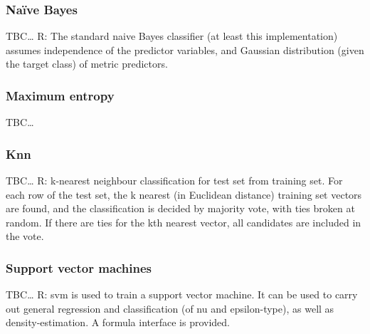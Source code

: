 \subsubsection{Na\"{i}ve Bayes} %
TBC\dots
R: The standard naive Bayes classifier (at least this implementation) assumes independence of the predictor variables, and Gaussian distribution (given the target class) of metric predictors.


\subsubsection{Maximum entropy} %
TBC\dots

\subsubsection{Knn} %
TBC\dots
R: k-nearest neighbour classification for test set from training set. For each row of the test set, the k
nearest (in Euclidean distance) training set vectors are found, and the classification is decided by
majority vote, with ties broken at random. If there are ties for the kth nearest vector, all candidates
are included in the vote.

\subsubsection{Support vector machines} %
TBC\dots
R: svm is used to train a support vector machine. It can be used to carry out general regression and
classification (of nu and epsilon-type), as well as density-estimation. A formula interface is provided.

